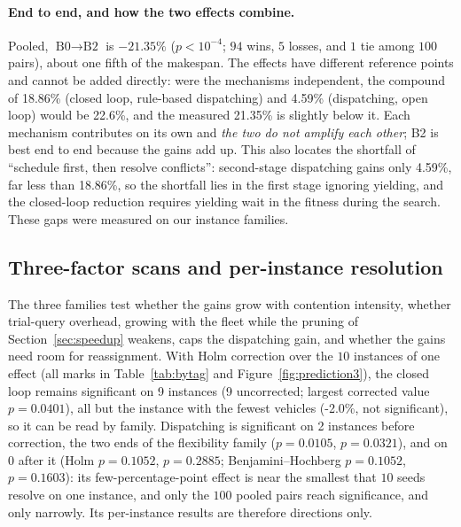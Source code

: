 \documentclass[preprint,review,12pt,authoryear]{elsarticle}
\newcommand{\NCases}{10}
\newcommand{\NSeeds}{10}
\newcommand{\NPairs}{100}
\newcommand{\GainLoopRule}{18.86\%}      %
\newcommand{\GainProbeOpen}{4.59\%}      %
\newcommand{\GainEndToEnd}{21.35\%}      %
\newcommand{\PEndToEnd}{<10^{-4}}
\newcommand{\WinEndToEnd}{94}
\newcommand{\LoseEndToEnd}{5}
\newcommand{\GainIndepProduct}{22.6\%}
\newcommand{\CellsSigLoop}{9}
\newcommand{\CellsSigLoopAdj}{9}
\newcommand{\CellsSigProbe}{2}
\newcommand{\CellsSigProbeAdj}{0}
\newcommand{\GainLoopStarve}{-2.0\%}     %
\newcommand{\PProbeFlexLoRaw}{=0.0105}
\newcommand{\PProbeFlexLoHolm}{=0.1052}
\newcommand{\PProbeFlexLoBH}{=0.1052}
\newcommand{\PProbeFlexHiRaw}{=0.0321}
\newcommand{\PProbeFlexHiHolm}{=0.2885}
\newcommand{\PProbeFlexHiBH}{=0.1603}
\newcommand{\PLoopCellMax}{=0.0401}
\begin{document}
\paragraph{End to end, and how the two effects combine.}
\label{sec:complement}
Pooled, $\text{B0}\to\text{B2}$ is $-\GainEndToEnd$ ($p\PEndToEnd$; $\WinEndToEnd$ wins, $\LoseEndToEnd$ losses, and $1$ tie among $\NPairs$ pairs), about one fifth of the makespan.
The effects have different reference points and cannot be added directly: were the mechanisms independent, the compound of \GainLoopRule{} (closed loop, rule-based dispatching) and \GainProbeOpen{} (dispatching, open loop) would be \GainIndepProduct{}, and the measured \GainEndToEnd{} is slightly below it.
Each mechanism contributes on its own and \emph{the two do not amplify each other}; B2 is best end to end because the gains add up.
This also locates the shortfall of ``schedule first, then resolve conflicts'': second-stage dispatching gains only \GainProbeOpen{}, far less than \GainLoopRule{}, so the shortfall lies in the first stage ignoring yielding, and the closed-loop reduction requires yielding wait in the fitness during the search. These gaps were measured on our instance families.

\subsection{Three-factor scans and per-instance resolution}
\label{sec:whichcongestion}

The three families test whether the gains grow with contention intensity, whether trial-query overhead, growing with the fleet while the pruning of Section~\ref{sec:speedup} weakens, caps the dispatching gain, and whether the gains need room for reassignment.
With Holm correction over the $\NCases$ instances of one effect (all marks in Table~\ref{tab:bytag} and Figure~\ref{fig:prediction3}), the closed loop remains significant on \CellsSigLoopAdj{} instances (\CellsSigLoop{} uncorrected; largest corrected value $p\PLoopCellMax$), all but the instance with the fewest vehicles (\GainLoopStarve{}, not significant), so it can be read by family.
Dispatching is significant on \CellsSigProbe{} instances before correction, the two ends of the flexibility family ($p\PProbeFlexLoRaw$, $p\PProbeFlexHiRaw$), and on \CellsSigProbeAdj{} after it (Holm $p\PProbeFlexLoHolm$, $p\PProbeFlexHiHolm$; Benjamini--Hochberg $p\PProbeFlexLoBH$, $p\PProbeFlexHiBH$): its few-percentage-point effect is near the smallest that $\NSeeds$ seeds resolve on one instance, and only the $\NPairs$ pooled pairs reach significance, and only narrowly.
Its per-instance results are therefore directions only.
\end{document}
